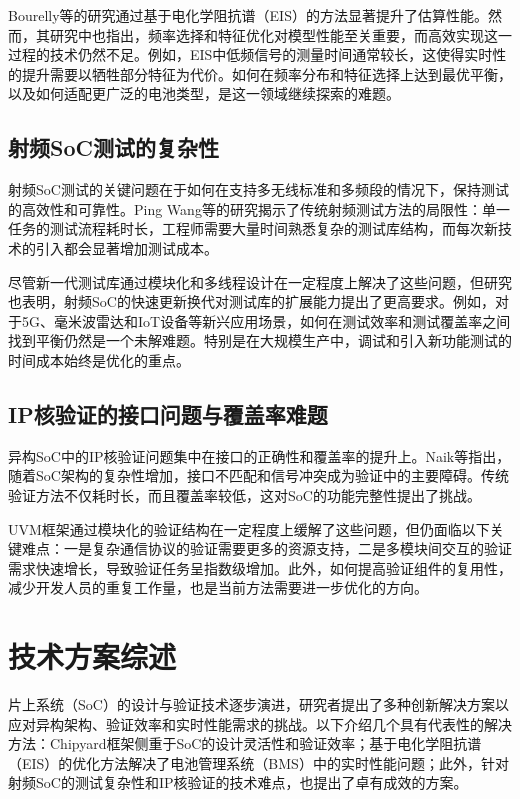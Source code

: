\documentclass[12pt,hyperref,a4paper,UTF8]{ctexart}
\begin{document}
Bourelly等的研究通过基于电化学阻抗谱（EIS）的方法显著提升了估算性能。然而，其研究中也指出，频率选择和特征优化对模型性能至关重要，而高效实现这一过程的技术仍然不足。例如，EIS中低频信号的测量时间通常较长，这使得实时性的提升需要以牺牲部分特征为代价。如何在频率分布和特征选择上达到最优平衡，以及如何适配更广泛的电池类型，是这一领域继续探索的难题\cite{10227269}。

\subsection{射频SoC测试的复杂性}
射频SoC测试的关键问题在于如何在支持多无线标准和多频段的情况下，保持测试的高效性和可靠性。Ping Wang等的研究揭示了传统射频测试方法的局限性：单一任务的测试流程耗时长，工程师需要大量时间熟悉复杂的测试库结构，而每次新技术的引入都会显著增加测试成本\cite{9461580}。

尽管新一代测试库通过模块化和多线程设计在一定程度上解决了这些问题，但研究也表明，射频SoC的快速更新换代对测试库的扩展能力提出了更高要求。例如，对于5G、毫米波雷达和IoT设备等新兴应用场景，如何在测试效率和测试覆盖率之间找到平衡仍然是一个未解难题。特别是在大规模生产中，调试和引入新功能测试的时间成本始终是优化的重点。

\subsection{IP核验证的接口问题与覆盖率难题}
异构SoC中的IP核验证问题集中在接口的正确性和覆盖率的提升上。Naik等指出，随着SoC架构的复杂性增加，接口不匹配和信号冲突成为验证中的主要障碍\cite{9641547}。传统验证方法不仅耗时长，而且覆盖率较低，这对SoC的功能完整性提出了挑战。

UVM框架通过模块化的验证结构在一定程度上缓解了这些问题，但仍面临以下关键难点：一是复杂通信协议的验证需要更多的资源支持，二是多模块间交互的验证需求快速增长，导致验证任务呈指数级增加。此外，如何提高验证组件的复用性，减少开发人员的重复工作量，也是当前方法需要进一步优化的方向\cite{9641547}。



\section{技术方案综述}

片上系统（SoC）的设计与验证技术逐步演进，研究者提出了多种创新解决方案以应对异构架构、验证效率和实时性能需求的挑战。以下介绍几个具有代表性的解决方法：Chipyard框架侧重于SoC的设计灵活性和验证效率；基于电化学阻抗谱（EIS）的优化方法解决了电池管理系统（BMS）中的实时性能问题；此外，针对射频SoC的测试复杂性和IP核验证的技术难点，也提出了卓有成效的方案。
\end{document}
